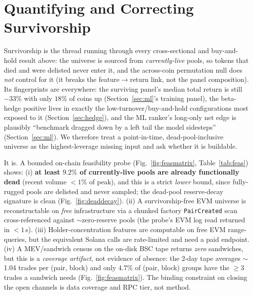 \documentclass[12pt]{article}
\begin{document}
\section{Quantifying and Correcting Survivorship}\label{sec:surv}
Survivorship is the thread running through every cross-sectional and buy-and-hold result above: the universe is sourced from \emph{currently-live} pools, so tokens that died and were delisted never enter it, and the across-coin permutation null does \emph{not} control for it (it breaks the feature$\to$return link, not the panel composition). Its fingerprints are everywhere: the surviving panel's median total return is still $-33\%$ with only $18\%$ of coins up (Section~\ref{sec:ml}'s training panel), the beta-hedge positive lives in exactly the low-turnover/buy-and-hold configurations most exposed to it (Section~\ref{sec:hedge}), and the ML ranker's long-only net edge is plausibly ``benchmark dragged down by a left tail the model sidesteps'' (Section~\ref{sec:ml}). We therefore treat a point-in-time, dead-pool-inclusive universe as the highest-leverage missing input and ask whether it is buildable.

It is. A bounded on-chain feasibility probe (Fig.~\ref{fig:feasmatrix}, Table~\ref{tab:feas}) shows: (i) \textbf{at least $9.2\%$ of currently-live pools are already functionally dead} (recent volume $<1\%$ of peak), and this is a strict \emph{lower} bound, since fully-rugged pools are delisted and never sampled; the dead-pool reserve-decay signature is clean (Fig.~\ref{fig:deaddecay}). (ii) A survivorship-free EVM universe is reconstructable on \emph{free} infrastructure via a chunked factory \texttt{PairCreated} scan cross-referenced against $\sim$zero-reserve pools (the probe's EVM log read returned in $<1$\,s). (iii) Holder-concentration features are computable on free EVM range-queries, but the equivalent Solana calls are rate-limited and need a paid endpoint. (iv) A MEV/sandwich census on the on-disk BSC tape returns \emph{zero} sandwiches, but this is a \emph{coverage artifact}, not evidence of absence: the 2-day tape averages $\sim$1.04 trades per (pair, block) and only $4.7\%$ of (pair, block) groups have the $\geq$3 trades a sandwich needs (Fig.~\ref{fig:feasmatrix}). The binding constraint on closing the open channels is data coverage and RPC tier, not method.
\end{document}
